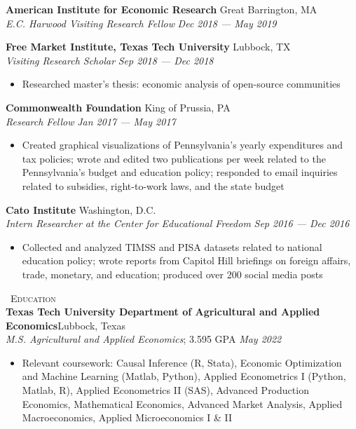 \documentclass[a4paper,11pt]{article}
\newcommand{\header} [1] {
    \vspace*{1mm}
    {\textsc{\large{\xrfill[0.1ex]{0.5pt}~#1~\xrfill[0.1ex]{0.5pt}}}} %
    \vspace*{1mm}
}
\begin{document}
\textbf{American Institute for Economic Research} \hfill Great Barrington, MA\\
\textit{E.C. Harwood Visiting Research Fellow} \hfill  \emph{Dec 2018 --- May 2019}\\
\vspace{1mm}

\textbf{Free Market Institute, Texas Tech University} \hfill Lubbock, TX\\
\textit{Visiting Research Scholar} \hfill  \emph{Sep 2018 --- Dec 2018}\\
\begin{itemize}
    \item Researched master's thesis: economic analysis of open-source communities
\end{itemize}
\vspace{1mm}

\textbf{Commonwealth Foundation} \hfill King of Prussia, PA\\
\textit{Research Fellow} \hfill  \emph{Jan 2017 --- May 2017}\\
\begin{itemize}
    \item Created graphical visualizations of Pennsylvania's yearly expenditures and tax policies; wrote and edited two publications per week related to the Pennsylvania's budget and education policy; responded to email inquiries related to subsidies, right-to-work laws, and the state budget
\end{itemize}
\vspace{1mm}

\textbf{Cato Institute} \hfill Washington, D.C.\\
\textit{Intern Researcher at the Center for Educational Freedom} \hfill \emph{Sep 2016 --- Dec 2016}\\
\begin{itemize}
    \item Collected and analyzed TIMSS and PISA datasets related to national education policy; wrote reports from Capitol Hill briefings on foreign affairs, trade, monetary, and education; produced over 200 social media posts 
\end{itemize}
\vspace{1mm}

\header{Education} \\
\textbf{Texas Tech University Department of Agricultural and Applied Economics}\hfill Lubbock, Texas\\
\textit{M.S. Agricultural and Applied Economics}; 3.595 GPA \hfill  \emph{May 2022} \\
\begin{itemize}
    \item Relevant coursework: Causal Inference (R, Stata), Economic Optimization and Machine Learning (Matlab, Python), Applied Econometrics I (Python, Matlab, R), Applied Econometrics II (SAS), Advanced Production Economics, Mathematical Economics, Advanced Market Analysis, Applied Macroeconomics, Applied Microeconomics I \& II
\end{itemize}
\end{document}
